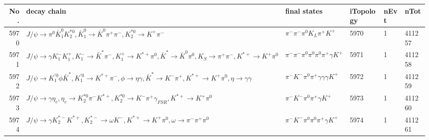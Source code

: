 \begin{table}[htbp] 
\begin{center}
\begin{small}
\begin{tabular}{rlllll}\hline\hline
 No. & decay chain & final states &  iTopology & nEvt & nTot \\\hline
5970&$J/\psi       \rightarrow \pi^{0}        \bar{K}_1^{0} K_2^{*0}       , \bar{K}_1^{0}  \rightarrow \bar{K}^{0}   \pi^{+}        \pi^{-}        , K_2^{*0}        \rightarrow K^{+}          \pi^{-}        $&$\pi^{-}        \pi^{-}        \pi^{0}        K_{L}          \pi^{+}        K^{+}          $& 5970&    1&411257\\
5971&$J/\psi       \rightarrow \gamma       K_{1}^{-}      K_1^{+}        , K_{1}^{-}       \rightarrow \bar{K}^{*}   \pi^{-}        , K_1^{+}         \rightarrow K^{*+}         \pi^{0}        , \bar{K}^{*}    \rightarrow \bar{K}^{0}   \pi^{0}        , K_{S}           \rightarrow \pi^{+}        \pi^{-}        , K^{*+}          \rightarrow K^{+}          \pi^{0}        $&$\pi^{-}        \pi^{-}        \pi^{0}        \pi^{0}        \pi^{0}        \pi^{+}        \gamma       K^{+}          $& 5971&    1&411258\\
5972&$J/\psi       \rightarrow K_1^{'0}      \phi           \bar{K}^{*}   , K_1^{'0}       \rightarrow K^{*+}         \pi^{-}        , \phi            \rightarrow \eta          \gamma       , \bar{K}^{*}    \rightarrow K^{-}          \pi^{+}        , K^{*+}          \rightarrow K^{+}          \pi^{0}        , \eta           \rightarrow \gamma       \gamma       $&$\pi^{-}        K^{-}          \pi^{0}        \pi^{+}        \gamma       \gamma       \gamma       K^{+}          $& 5972&    1&411259\\
5973&$J/\psi       \rightarrow \gamma       \eta_{c}    , \eta_{c}     \rightarrow K_2^{*0}       \pi^{-}        K^{*+}         , K_2^{*0}        \rightarrow K^{-}          \pi^{+}        \gamma_{FSR} , K^{*+}          \rightarrow K^{+}          \pi^{0}        $&$\pi^{-}        K^{-}          \pi^{0}        \pi^{+}        \gamma       K^{+}          $& 5973&    1&411260\\
5974&$J/\psi       \rightarrow \gamma       K_2^{*-}       K^{*+}         , K_2^{*-}        \rightarrow \omega         K^{-}          , K^{*+}          \rightarrow K^{+}          \pi^{0}        , \omega          \rightarrow \pi^{-}        \pi^{+}        \pi^{0}        $&$\pi^{-}        K^{-}          \pi^{0}        \pi^{0}        \pi^{+}        \gamma       K^{+}          $& 5974&    1&411261\\

\end{tabular}
\end{small}
\end{center}
\end{table}
